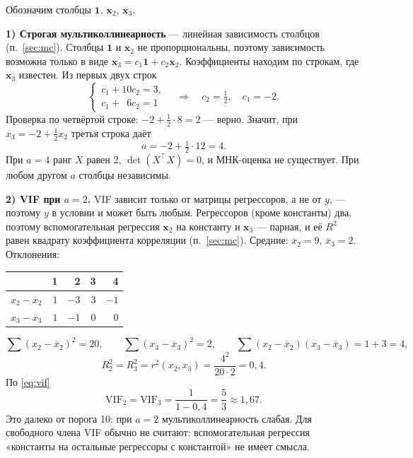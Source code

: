 \begin{solution}
Обозначим столбцы $\mathbf{1}$, $\mathbf{x}_2$, $\mathbf{x}_3$.

\medskip
\textbf{1) Строгая мультиколлинеарность} — линейная зависимость столбцов
(п.~\ref{sec:mc}). Столбцы $\mathbf{1}$ и $\mathbf{x}_2$ не пропорциональны,
поэтому зависимость возможна только в виде
$\mathbf{x}_3 = c_1\mathbf{1} + c_2\mathbf{x}_2$. Коэффициенты находим по
строкам, где $\mathbf{x}_3$ известен. Из первых двух строк
\[
  \begin{cases}
    c_1 + 10c_2 = 3, \\
    c_1 + \phantom{0}6c_2 = 1
  \end{cases}
  \quad\Longrightarrow\quad
  c_2 = \tfrac12,\quad c_1 = -2 .
\]
Проверка по четвёртой строке: $-2 + \tfrac12\cdot 8 = 2$ — верно. Значит,
при $x_3 = -2 + \tfrac12x_2$ третья строка даёт
\[
  a = -2 + \tfrac12\cdot 12 = 4 .
\]
При $a = 4$ ранг $X$ равен 2, $\det(X^{\top}X) = 0$, и МНК-оценка не
существует. При любом другом $a$ столбцы независимы.

\medskip
\textbf{2) VIF при $a = 2$.} VIF зависит только от матрицы регрессоров, а не
от $y$, — поэтому $y$ в условии и может быть любым. Регрессоров (кроме
константы) два, поэтому вспомогательная регрессия $\mathbf{x}_2$ на константу
и $\mathbf{x}_3$ — парная, и её $R^2$ равен квадрату коэффициента корреляции
(п.~\ref{sec:mc}). Средние: $\overline{x}_2 = 9$, $\overline{x}_3 = 2$.
Отклонения:
\begin{center}
\begin{tabular}{crrrr}
\toprule
 & 1 & 2 & 3 & 4 \\
\midrule
$x_2 - \overline{x}_2$ & $1$ & $-3$ & $3$ & $-1$ \\
$x_3 - \overline{x}_3$ & $1$ & $-1$ & $0$ & $0$ \\
\bottomrule
\end{tabular}
\end{center}
\[
  \sum (x_2 - \overline{x}_2)^2 = 20,
  \qquad
  \sum (x_3 - \overline{x}_3)^2 = 2,
  \qquad
  \sum (x_2 - \overline{x}_2)(x_3 - \overline{x}_3) = 1 + 3 = 4,
\]
\[
  R_2^2 = R_3^2 = r^2(x_2, x_3) = \frac{4^2}{20\cdot 2} = 0{,}4 .
\]
По \eqref{eq:vif}
\[
  \mathrm{VIF}_2 = \mathrm{VIF}_3 = \frac{1}{1 - 0{,}4} = \frac53 \approx 1{,}67 .
\]
Это далеко от порога 10: при $a = 2$ мультиколлинеарность слабая. Для
свободного члена VIF обычно не считают: вспомогательная регрессия
«константы на остальные регрессоры с константой» не имеет смысла.
\end{solution}
